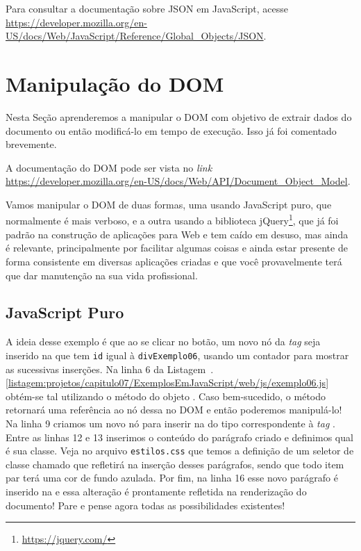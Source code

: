 \begin{saibaMais}
    Para consultar a documentação sobre JSON em JavaScript, acesse \url{https://developer.mozilla.org/en-US/docs/Web/JavaScript/Reference/Global_Objects/JSON}.
\end{saibaMais}



\section{Manipulação do DOM}

Nesta Seção aprenderemos a manipular o DOM com objetivo de extrair dados do documento ou então modificá-lo em tempo de execução. Isso já foi comentado brevemente.

\begin{saibaMais}
    A documentação do DOM pode ser vista no \textit{link} \url{https://developer.mozilla.org/en-US/docs/Web/API/Document_Object_Model}.
\end{saibaMais}

Vamos manipular o DOM de duas formas, uma usando JavaScript puro, que normalmente é mais verboso, e a outra usando a biblioteca jQuery\footnote{\url{https://jquery.com/}}, que já foi padrão na construção de aplicações para Web e tem caído em desuso, mas ainda é relevante, principalmente por facilitar algumas coisas e ainda estar presente de forma consistente em diversas aplicações criadas e que você provavelmente terá que dar manutenção na sua vida profissional.


\subsection{JavaScript Puro}

A ideia desse exemplo é que ao se clicar no botão, um novo nó da \textit{tag}  seja inserido na  que tem \texttt{id} igual à \texttt{divExemplo06}, usando um contador para mostrar as sucessivas inserções. Na linha 6 da Listagem~\thechapter.\ref{listagem:projetos/capitulo07/ExemplosEmJavaScript/web/js/exemplo06.js} obtém-se tal  utilizando o método  do objeto . Caso bem-sucedido, o método retornará uma referência ao nó dessa  no DOM e então poderemos manipulá-lo! Na linha 9 criamos um novo nó para inserir na  do tipo correspondente à \textit{tag} . Entre as linhas 12 e 13 inserimos o conteúdo do parágrafo criado e definimos qual é sua classe. Veja no arquivo \texttt{estilos.css} que temos a definição de um seletor de classe chamado  que refletirá na inserção desses parágrafos, sendo que todo item par terá uma cor de fundo azulada. Por fim, na linha 16 esse novo parágrafo é inserido na  e essa alteração é prontamente refletida na renderização do documento! Pare e pense agora todas as possibilidades existentes!

